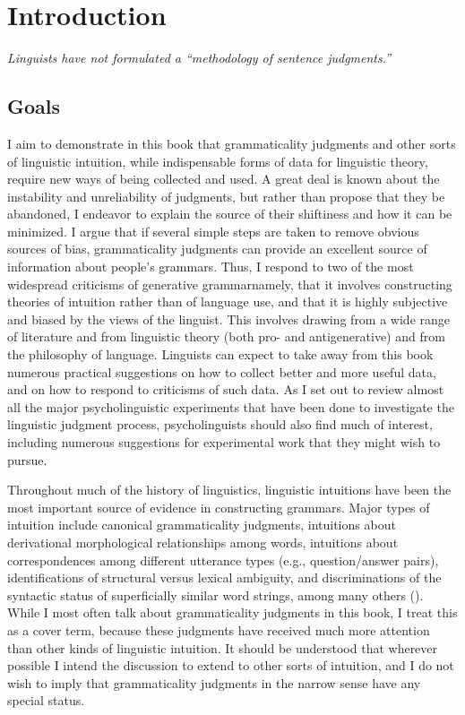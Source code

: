 \chapter{Introduction}\label{sec:1}
\epigraph{\itshape Linguists have not formulated a ``methodology of sentence judgments.''\\[-2\baselineskip]}{\citep{vanRiemsdijk1986}}
\section{Goals}\label{sec:1.1} 
I aim to demonstrate in this book that grammaticality judgments and other sorts of linguistic intuition, while indispensable forms of data for linguistic theory, require new ways of being collected and used. A great deal is known about the instability and unreliability of judgments, but rather than propose that they be abandoned, I endeavor to explain the source of their shiftiness and how it can be minimized. I argue that if several simple steps are taken to remove obvious sources of bias, grammaticality judgments can provide an excellent source of information about people's grammars. Thus, I respond to two of the most widespread criticisms of generative grammar\schdash{}namely, that it involves constructing theories of intuition rather than of language use, and that it is highly subjective and biased by the views of the linguist. This involves drawing from a wide range of literature and from linguistic theory (both pro- and antigenerative) and from the philosophy of language. Linguists can expect to take away from this book numerous practical
suggestions on how to collect better and more useful data, and on how to respond to criticisms of such data. As I set out to review almost all the major psycholinguistic experiments that have been done to investigate the linguistic judgment process, psycholinguists should also find much of interest, including numerous suggestions for experimental work that they might wish to pursue.

Throughout much of the history of linguistics,  linguistic  intuitions  have been the most important source of evidence in  constructing  grammars.  Major types of intuition include canonical grammaticality judgments, intuitions about derivational morphological relationships among words, intuitions about correspondences among different utterance types (e.g., question/answer  pairs), identifications%
 of structural versus lexical ambiguity, and discriminations of the syntactic status of superficially similar word strings, among many others (\citet{Chomsky1985}). While I most often talk about grammaticality judgments  in this book, I treat this as a cover term, because these judgments have received much more attention than other kinds of linguistic intuition. It should be understood that wherever possible I intend the discussion to extend to other sorts of intuition, and I do not wish to imply that grammaticality judgments in the narrow sense have any special status.

